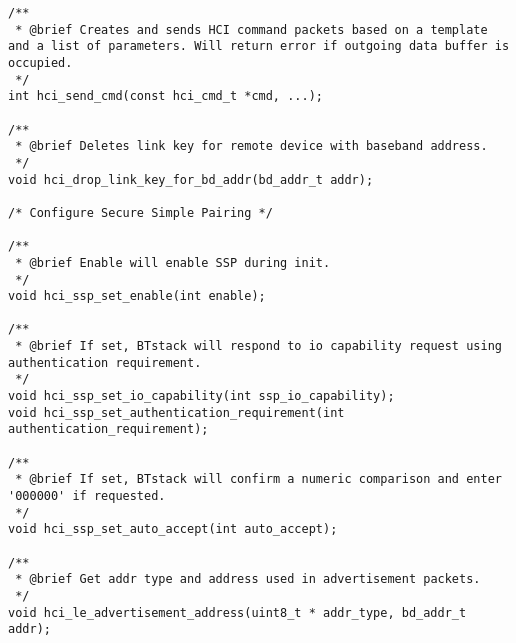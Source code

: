 \begin{lstlisting}
/**
 * @brief Creates and sends HCI command packets based on a template and a list of parameters. Will return error if outgoing data buffer is occupied. 
 */
int hci_send_cmd(const hci_cmd_t *cmd, ...);

/**
 * @brief Deletes link key for remote device with baseband address.
 */
void hci_drop_link_key_for_bd_addr(bd_addr_t addr);

/* Configure Secure Simple Pairing */

/**
 * @brief Enable will enable SSP during init.
 */
void hci_ssp_set_enable(int enable);

/**
 * @brief If set, BTstack will respond to io capability request using authentication requirement.
 */
void hci_ssp_set_io_capability(int ssp_io_capability);
void hci_ssp_set_authentication_requirement(int authentication_requirement);

/**
 * @brief If set, BTstack will confirm a numeric comparison and enter '000000' if requested.
 */
void hci_ssp_set_auto_accept(int auto_accept);

/**
 * @brief Get addr type and address used in advertisement packets.
 */
void hci_le_advertisement_address(uint8_t * addr_type, bd_addr_t addr);
\end{lstlisting}
\pagebreak
